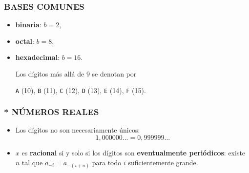 \begin{frame}
  \frametitle{BASES COMUNES}



  \begin{itemize}
  \item<4-> \textbf{binaria}: $b = 2$,

  \item<5-> \textbf{octal}: $b = 8$,

  \item<6-> \textbf{hexadecimal}: $b = 16$.

    Los dígitos más allá de $9$ se denotan por

    \texttt{A} (10), \texttt{B} (11), \texttt{C} (12), \texttt{D} (13), \texttt{E} (14), \texttt{F} (15).

  \end{itemize}
\end{frame}

\begin{frame}
  \frametitle{* NÚMEROS REALES}


  \begin{itemize}
  \item<3-> Los dígitos no son necesariamente únicos:
    $$1,000000\ldots = 0,999999\ldots$$

  \item<4-> $x$ es \textbf{racional} si y solo si los dígitos son
    \textbf{eventualmente periódicos}: existe $n$ tal que
    $a_{-i} = a_{-(i+n)}$ para todo $i$ suficientemente grande.

  \end{itemize}
\end{frame}

